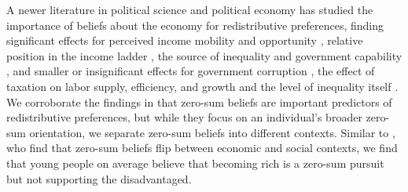 \documentclass{article}
\begin{document}
A newer literature in political science and political economy has studied the importance of beliefs about the economy for redistributive preferences, finding significant effects for perceived income mobility and opportunity \citep{fong2001social, alesina2005preferences, alesina2018intergenerational, bonnet2025explains}, relative position in the income ladder \citep{cruces2013biased,karadja2017richer,hoy2021relatively,hvidberg2023social}, the source of inequality \citep{alesina2021perceptions, almaas2026fairness} and government capability \citep{stantcheva2021understanding}, and smaller or insignificant effects for government corruption \citep{peyton2020does},  the effect of taxation on labor supply, efficiency, and growth \citep{kuziemko2015elastic, stantcheva2021understanding} and the level of inequality itself \citep{kenworthy2007inequality}.  We corroborate the findings in \cite{chinoy2026zero} that zero-sum beliefs are important predictors of redistributive preferences, but while they focus on an individual's broader zero-sum orientation, we separate zero-sum beliefs into different contexts. Similar to \cite{davidai2019politics}, who find that zero-sum beliefs flip between economic and social contexts, we find that young people on average believe that becoming rich is a zero-sum pursuit but not supporting the disadvantaged. 
\end{document}
